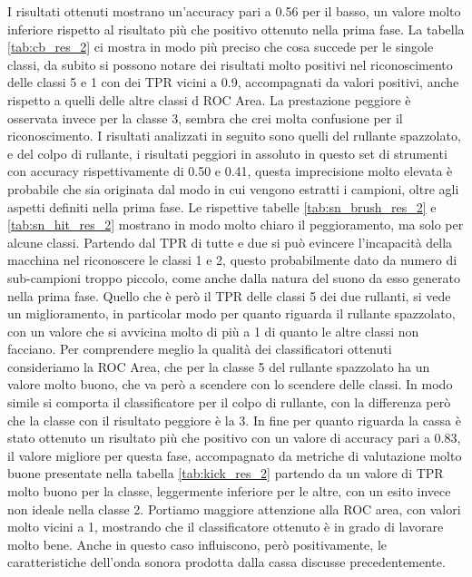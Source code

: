 I risultati ottenuti mostrano un'accuracy pari a 0.56 per il basso, un valore molto inferiore rispetto al risultato più che positivo ottenuto nella prima fase. La tabella \ref{tab:cb_res_2} ci mostra in modo più preciso che cosa succede per le singole classi, da subito si possono notare dei risultati molto positivi nel riconoscimento delle classi 5 e 1 con dei TPR vicini a 0.9, accompagnati da valori positivi, anche rispetto a quelli delle altre classi d ROC Area. La prestazione peggiore è osservata invece per la classe 3, sembra che crei molta confusione per il riconoscimento.
I risultati analizzati in seguito sono quelli del rullante spazzolato, e del colpo di rullante, i risultati peggiori in assoluto in questo set di strumenti con accuracy rispettivamente di 0.50 e 0.41, questa imprecisione molto elevata è probabile che sia originata dal modo in cui vengono estratti i campioni, oltre agli aspetti definiti nella prima fase. Le rispettive tabelle \ref{tab:sn_brush_res_2} e \ref{tab:sn_hit_res_2} mostrano in modo molto chiaro il peggioramento, ma solo per alcune classi. Partendo dal TPR di tutte e due si può evincere l'incapacità della macchina nel riconoscere le classi 1 e 2, questo probabilmente dato da numero di sub-campioni troppo piccolo, come anche dalla natura del suono da esso generato nella prima fase. Quello che è però il TPR delle classi 5 dei due rullanti, si vede un miglioramento, in particolar modo per quanto riguarda il rullante spazzolato, con un valore che si avvicina molto di più a 1 di quanto le altre classi non facciano. Per comprendere meglio la qualità dei classificatori ottenuti consideriamo la ROC Area, che per la classe 5 del rullante spazzolato ha un valore molto buono, che va però a scendere con lo scendere delle classi. In modo simile si comporta il classificatore per il colpo di rullante, con la differenza però che la classe con il risultato peggiore è la 3.
In fine per quanto riguarda la cassa è stato ottenuto un risultato più che positivo con un valore di accuracy pari a 0.83, il valore migliore per questa fase, accompagnato da metriche di valutazione molto buone presentate nella tabella \ref{tab:kick_res_2} partendo da un valore di TPR molto buono per la classe, leggermente inferiore per le altre, con un esito invece non ideale nella classe 2. Portiamo maggiore attenzione alla ROC area, con valori molto vicini a 1, mostrando che il classificatore ottenuto è in grado di lavorare molto bene. Anche in questo caso influiscono, però positivamente, le caratteristiche dell'onda sonora prodotta dalla cassa discusse precedentemente.\\


